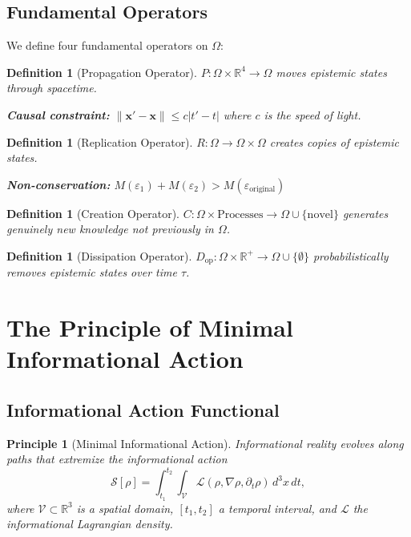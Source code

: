 \documentclass[12pt]{article}
\newtheorem{definition}[theorem]{Definition}
\newtheorem{principle}{Principle}
\begin{document}
\subsection{Fundamental Operators}

We define four fundamental operators on $\Omega$:

\begin{definition}[Propagation Operator]
$P: \Omega \times \mathbb{R}^4 \to \Omega$ moves epistemic states through spacetime.

\textbf{Causal constraint:} $\|\mathbf{x}' - \mathbf{x}\| \leq c|t' - t|$ where $c$ is the speed of light.
\end{definition}

\begin{definition}[Replication Operator]
$R: \Omega \to \Omega \times \Omega$ creates copies of epistemic states.

\textbf{Non-conservation:} $M(\varepsilon_1) + M(\varepsilon_2) > M(\varepsilon_{\text{original}})$
\end{definition}

\begin{definition}[Creation Operator]
$C: \Omega \times \text{Processes} \to \Omega \cup \{\text{novel}\}$ generates genuinely new knowledge not previously in $\Omega$.
\end{definition}

\begin{definition}[Dissipation Operator]
$D_{\text{op}}: \Omega \times \mathbb{R}^+ \to \Omega \cup \{\emptyset\}$ probabilistically removes epistemic states over time $\tau$.
\end{definition}

\section{The Principle of Minimal Informational Action}

\subsection{Informational Action Functional}

\begin{principle}[Minimal Informational Action]
\label{prin:action}
Informational reality evolves along paths that extremize the \emph{informational action}
\begin{equation}
    \mathcal{S}[\rho] = \int_{t_1}^{t_2} \int_{\mathcal{V}} \mathcal{L}(\rho, \nabla \rho, \partial_t \rho)\, d^3x\, dt,
    \label{eq:action}
\end{equation}
where $\mathcal{V} \subset \mathbb{R}^3$ is a spatial domain, $[t_1, t_2]$ a temporal interval, and $\mathcal{L}$ the \emph{informational Lagrangian density}.
\end{principle}
\end{document}
